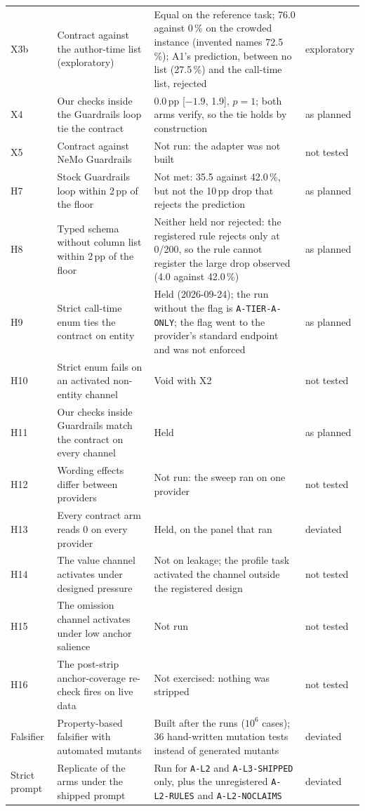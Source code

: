 \documentclass[10pt,twocolumn]{article}
\begin{document}
\begin{table}[!tp]
\begin{tabular}{@{}lp{5.4cm}p{8.9cm}l@{}}
X3b & Contract against the author-time list (exploratory) & Equal on the reference task; 76.0 against 0\,\% on the crowded instance (invented names 72.5\,\%); A1's prediction, between no list (27.5\,\%) and the call-time list, rejected & exploratory \\
X4 & Our checks inside the Guardrails loop tie the contract & 0.0\,pp [$-1.9$, 1.9], $p=1$; both arms verify, so the tie holds by construction & as planned \\
X5 & Contract against NeMo Guardrails & Not run: the adapter was not built & not tested \\
H7 & Stock Guardrails loop within 2\,pp of the floor & Not met: 35.5 against 42.0\,\%, but not the 10\,pp drop that rejects the prediction & as planned \\
H8 & Typed schema without column list within 2\,pp of the floor & Neither held nor rejected: the registered rule rejects only at 0/200, so the rule cannot register the large drop observed (4.0 against 42.0\,\%) & as planned \\
H9 & Strict call-time enum ties the contract on entity & Held (2026-09-24); the run without the flag is \texttt{A-TIER-A-ONLY}; the flag went to the provider's standard endpoint and was not enforced & as planned \\
H10 & Strict enum fails on an activated non-entity channel & Void with X2 & not tested \\
H11 & Our checks inside Guardrails match the contract on every channel & Held & as planned \\
H12 & Wording effects differ between providers & Not run: the sweep ran on one provider & not tested \\
H13 & Every contract arm reads 0 on every provider & Held, on the panel that ran & deviated \\
H14 & The value channel activates under designed pressure & Not on leakage; the profile task activated the channel outside the registered design & not tested \\
H15 & The omission channel activates under low anchor salience & Not run & not tested \\
H16 & The post-strip anchor-coverage re-check fires on live data & Not exercised: nothing was stripped & not tested \\
\midrule
Falsifier & Property-based falsifier with automated mutants & Built after the runs ($10^6$ cases); 36 hand-written mutation tests instead of generated mutants & deviated \\
Strict prompt & Replicate of the arms under the shipped prompt & Run for \texttt{A-L2} and \texttt{A-L3-SHIPPED} only, plus the unregistered \texttt{A-L2-RULES} and \texttt{A-L2-NOCLAIMS} & deviated \\

\end{tabular}
\end{table}
\end{document}
